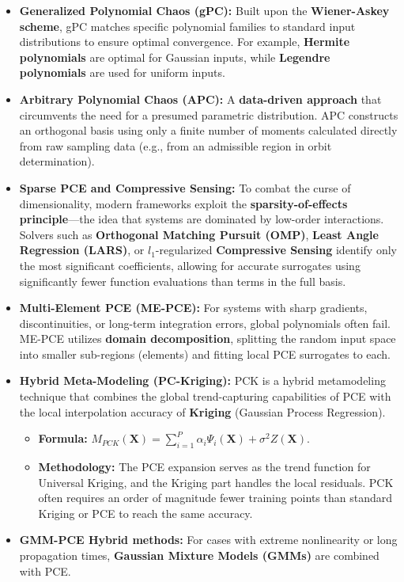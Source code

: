 \documentclass[
  letterpaper,
  DIV=11,
  numbers=noendperiod,
  oneside]{scrartcl}
\begin{document}
\begin{itemize}
\item
  \textbf{Generalized Polynomial Chaos (gPC):} Built upon the
  \textbf{Wiener-Askey scheme}, gPC matches specific polynomial families
  to standard input distributions to ensure optimal convergence. For
  example, \textbf{Hermite polynomials} are optimal for Gaussian inputs,
  while \textbf{Legendre polynomials} are used for uniform inputs.
\item
  \textbf{Arbitrary Polynomial Chaos (APC):} A \textbf{data-driven
  approach} that circumvents the need for a presumed parametric
  distribution. APC constructs an orthogonal basis using only a finite
  number of moments calculated directly from raw sampling data (e.g.,
  from an admissible region in orbit determination).
\item
  \textbf{Sparse PCE and Compressive Sensing:} To combat the curse of
  dimensionality, modern frameworks exploit the
  \textbf{sparsity-of-effects principle}---the idea that systems are
  dominated by low-order interactions. Solvers such as
  \textbf{Orthogonal Matching Pursuit (OMP)}, \textbf{Least Angle
  Regression (LARS)}, or \(l_1\)-regularized \textbf{Compressive
  Sensing} identify only the most significant coefficients, allowing for
  accurate surrogates using significantly fewer function evaluations
  than terms in the full basis.
\item
  \textbf{Multi-Element PCE (ME-PCE):} For systems with sharp gradients,
  discontinuities, or long-term integration errors, global polynomials
  often fail. ME-PCE utilizes \textbf{domain decomposition}, splitting
  the random input space into smaller sub-regions (elements) and fitting
  local PCE surrogates to each.
\item
  \textbf{Hybrid Meta-Modeling (PC-Kriging):} PCK is a hybrid
  metamodeling technique that combines the global trend-capturing
  capabilities of PCE with the local interpolation accuracy of
  \textbf{Kriging} (Gaussian Process Regression).

  \begin{itemize}
  \item
    \textbf{Formula:}
    \(M_{PCK}(\boldsymbol{X}) = \sum_{i=1}^{P} \alpha_i \Psi_i(\boldsymbol{X}) + \sigma^2 Z(\boldsymbol{X})\).
  \item
    \textbf{Methodology:} The PCE expansion serves as the trend function
    for Universal Kriging, and the Kriging part handles the local
    residuals. PCK often requires an order of magnitude fewer training
    points than standard Kriging or PCE to reach the same accuracy.
  \end{itemize}
\item
  \textbf{GMM-PCE Hybrid methods:} For cases with extreme nonlinearity
  or long propagation times, \textbf{Gaussian Mixture Models (GMMs)} are
  combined with PCE.


\end{itemize}
\end{document}
